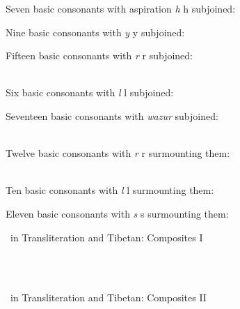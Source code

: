 \documentclass[a4paper,11pt]{article}
\begin{document}
\begin{table}
\begin{center}
Seven basic consonants with aspiration \textit{h} {\tib h} subjoined:\\
      

\bigskip Nine basic consonants with \textit{y} {\tib y} subjoined:\\
      
 

\bigskip Fifteen basic consonants with \textit{r} {\tib r} subjoined:\\
        \\
          

\bigskip Six basic consonants with \textit{l} {\tib l} subjoined:\\
       

\bigskip Seventeen basic consonants with \textit{wazur} subjoined:\\
          \\
         

\bigskip Twelve basic consonants with \textit{r} {\tib r} surmounting them:\\
       \\
       

\bigskip Ten basic consonants with \textit{l} {\tib l} surmounting them:\\
     
      

\bigskip Eleven basic consonants with \textit{s} {\tib s} surmounting them:\\
     
      

\end{center}
\caption{\TibTeX\ in Transliteration and Tibetan: Composites I}
\end{table}

\begin{table}
\begin{center}
        \\
        \\
     
\end{center}
\caption{\TibTeX\ in Transliteration and Tibetan: Composites II}
\end{table}
\end{document}

